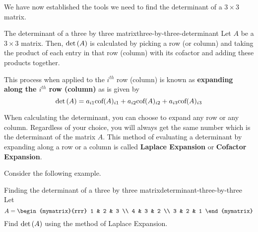 We have now established the tools we need to find the determinant of a $3 \times3 $ matrix.

\begin{definition}{The determinant of a three by three matrix}{three-by-three-determinant}
Let $A$ be a $3\times 3$ matrix. Then, $\det \left(A\right)$ is calculated by picking a row
(or column) and taking the product of each entry in that row (column) with its
cofactor and adding these products together. 

This process when applied to the $i^{th}$
row (column) is known as \textbf{expanding along the $i^{th}$ row
(column)} as is given by 
\[
\det \left(A\right) = a_{i1}\mbox{\rm cof}(A)_{i1} + a_{i2}\mbox{\rm cof}(A)_{i2} + a_{i3}\mbox{\rm cof}(A)_{i3}
\]

\end{definition}

When calculating the determinant, you can choose to expand any row or any column. Regardless 
of your choice, you will always get the same number which is the determinant of the matrix $A$. 
This method of evaluating a determinant by expanding along a row or a column is called \textbf{Laplace
Expansion} or \textbf{Cofactor Expansion}.


Consider the following example. 

\begin{example}{Finding the determinant of a three by three matrix}{determinant-three-by-three}
Let 
\begin{equation*}
A=\begin{mymatrix}{rrr}
1 & 2 & 3 \\
4 & 3 & 2 \\
3 & 2 & 1
\end{mymatrix} 
\end{equation*}
Find $\det\left(A\right)$ using the method of Laplace Expansion.
\end{example}

